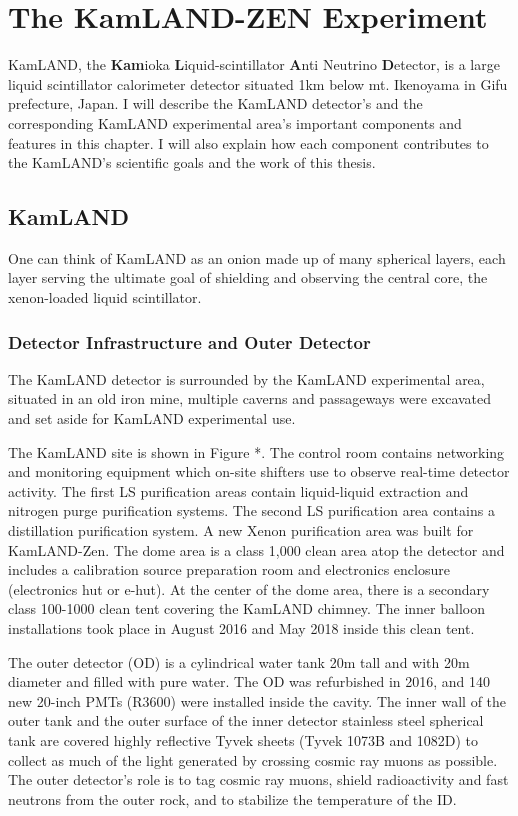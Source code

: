 \chapter{The KamLAND-ZEN Experiment}
\label{chapter:klz-detector}
\thispagestyle{myheadings}
\graphicspath{{2_Chapter_KLZ_Detector/Figures/}}

KamLAND, the \textbf{Kam}ioka \textbf{L}iquid-scintillator \textbf{A}nti Neutrino \textbf{D}etector, is a large liquid scintillator calorimeter detector situated 1km below mt. Ikenoyama in Gifu prefecture, Japan. I will describe the KamLAND detector's and the corresponding KamLAND experimental area's important components and features in this chapter. I will also explain how each component contributes to the KamLAND's scientific goals and the work of this thesis.


\section{KamLAND}
\label{sec:KamLAND}
One can think of KamLAND as an onion made up of many spherical layers, each layer serving the ultimate goal of shielding and observing the central core, the xenon-loaded liquid scintillator.


\subsection{Detector Infrastructure and Outer Detector}
The KamLAND detector is surrounded by the KamLAND experimental area, situated in an old iron mine, multiple caverns and passageways were excavated and set aside for KamLAND experimental use.

The KamLAND site is shown in Figure *. The control room contains networking and monitoring equipment which on-site shifters use to observe real-time detector activity. The first LS purification areas contain liquid-liquid extraction and nitrogen purge purification systems. The second LS purification area contains a distillation purification system. A new Xenon purification area was built for KamLAND-Zen. The dome area is a class 1,000 clean area atop the detector and includes a calibration source preparation room and electronics enclosure (electronics hut or e-hut). At the center of the dome area, there is a secondary class 100-1000 clean tent covering the KamLAND chimney. The inner balloon installations took place in August 2016 and May 2018 inside this clean tent.

The outer detector (OD) is a cylindrical water tank 20m tall and with 20m diameter and filled with pure water. The OD was refurbished in 2016, and 140 new 20-inch PMTs (R3600) were installed inside the cavity. The inner wall of the outer tank and the outer surface of the inner detector stainless steel spherical tank are covered highly reflective Tyvek sheets (Tyvek 1073B and 1082D) to collect as much of the light generated by crossing cosmic ray muons as possible. The outer detector's role is to tag cosmic ray muons, shield radioactivity and fast neutrons from the outer rock, and to stabilize the temperature of the ID.

